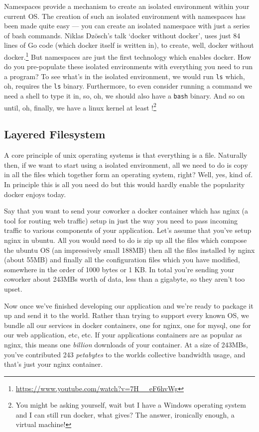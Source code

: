 \documentclass{csse4400}
\begin{document}
Namespaces provide a mechanism to create an isolated environment within your current OS.
The creation of such an isolated environment with namespaces has been made quite easy --- you can create an isolated namespace with just a series of bash commands.
Niklas Dz{\"o}sch's talk `docker without docker', uses just 84 lines of Go code (which docker itself is written in),
to create, well, docker without docker.\footnote{\url{https://www.youtube.com/watch?v=7H__eF6hvWg}}
But namespaces are just the first technology which enables docker.
How do you pre-populate these isolated environments with everything you need to run a program?
To see what's in the isolated environment, we would run \texttt{ls} which, oh, requires the \texttt{ls} binary.
Furthermore, to even consider running a command we need a shell to type it in, so, oh, we should also have a \texttt{bash} binary.
And so on until, oh, finally, we have a linux kernel at least%
!\footnote{You might be asking yourself, wait but I have a Windows operating system and I can still run docker, what gives? The answer, ironically enough, a virtual machine!}

\subsection{Layered Filesystem}
A core principle of unix operating systems is that everything is a file.
Naturally then, if we want to start using a isolated environment,
all we need to do is copy in all the files which together form an operating system, right?
Well, yes, kind of.
In principle this is all you need do but this would hardly enable the popularity docker enjoys today.

Say that you want to send your coworker a docker container which has nginx (a tool for routing web traffic)
setup in just the way you need to pass incoming traffic to various components of your application.
Let's assume that you've setup nginx in ubuntu.
All you would need to do is zip up all the files which compose the ubuntu OS (an impressively small 188MB)
then all the files installed by nginx (about 55MB) and finally all the configuration files which you have modified,
somewhere in the order of 1000 bytes or 1 KB.
In total you're sending your coworker about 243MBs worth of data, less than a gigabyte, so they aren't too upset.

Now once we've finished developing our application and we're ready to package it up and send it to the world.
Rather than trying to support every known OS, we bundle all our services in docker containers,
one for nginx, one for mysql, one for our web application, etc, etc.
If your applications containers are as popular as nginx, this means one \textsl{billion} downloads of your container.
At a size of 243MBs, you've contributed 243 \textsl{petabytes} to the worlds collective bandwidth usage, and that's just your nginx container.
\end{document}
